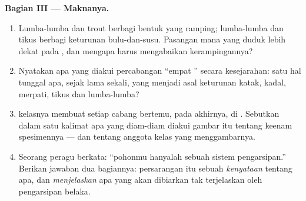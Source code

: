 \begin{problem}
\medskip\noindent\textbf{Bagian III --- Maknanya.}
\begin{enumerate}[resume]
  \item Lumba-lumba dan  trout berbagi bentuk yang ramping;
        lumba-lumba dan tikus berbagi keturunan bulu-dan-susu. Pasangan
        mana yang duduk lebih dekat pada , dan mengapa
         harus mengabaikan kerampingannya?
  \item Nyatakan apa yang diakui percabangan ``empat ''
        secara kesejarahan: satu hal tunggal apa, sejak lama sekali,
        yang menjadi asal keturunan katak, kadal, merpati, tikus dan
        lumba-lumba?
  \item {} kelasnya membuat setiap cabang bertemu, pada akhirnya,
        di . Sebutkan dalam satu kalimat apa yang diam-diam
        diakui gambar itu tentang keenam spesimennya --- dan tentang
        anggota kelas yang menggambarnya.
  \item Seorang peragu berkata: ``pohonmu hanyalah sebuah sistem
        pengarsipan.'' Berikan jawaban dua bagiannya: persarangan
         itu sebuah \emph{kenyataan} tentang apa, dan 
        \emph{menjelaskan} apa yang akan dibiarkan tak terjelaskan
        oleh pengarsipan belaka.
\end{enumerate}
\end{problem}
